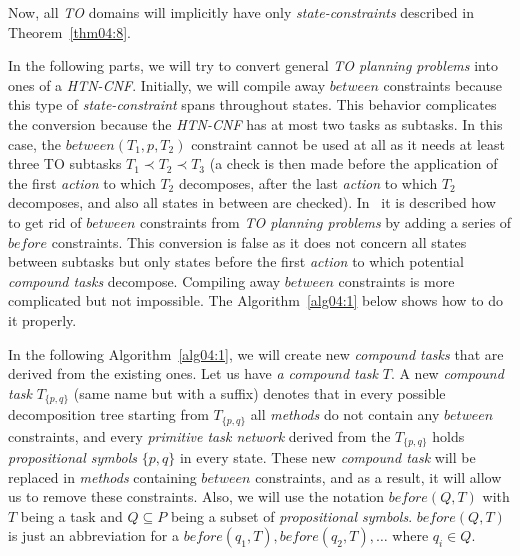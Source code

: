\medskip\noindent
Now, all \emph{TO} domains will implicitly have only \emph{state-constraints} described in Theorem~\ref{thm04:8}.

\medskip\noindent
In the following parts, we will try to convert general \emph{TO planning problems} into ones of a \emph{HTN-CNF}. Initially, we will compile away $between$ constraints because this type of \emph{state-constraint} spans throughout states. This behavior complicates the conversion because the \emph{HTN-CNF} has at most two tasks as subtasks. In this case, the $between(T_1, p, T_2)$ constraint cannot be used at all as it needs at least three TO subtasks $T_1 \prec T_2 \prec T_3$ (a check is then made before the application of the first \emph{action} to which $T_2$ decomposes, after the last \emph{action} to which $T_2$ decomposes, and also all states in between are checked). In~\cite{ondrckova2024empty} it is described how to get rid of $between$ constraints from \emph{TO planning problems} by adding a series of $before$ constraints. This conversion is false as it does not concern all states between subtasks but only states before the first \emph{action} to which potential \emph{compound tasks} decompose. Compiling away $between$ constraints is more complicated but not impossible. The Algorithm~\ref{alg04:1} below shows how to do it properly.

\medskip\noindent
In the following Algorithm~\ref{alg04:1}, we will create new \emph{compound tasks} that are derived from the existing ones. Let us have \emph{a compound task} $T$. A new \emph{compound task} $T_{\{p, q\}}$ (same name but with a suffix) denotes that in every possible decomposition tree starting from $T_{\{p, q\}}$ all \emph{methods} do not contain any $between$ constraints, and every \emph{primitive task network} derived from the $T_{\{p, q\}}$ holds \emph{propositional symbols} $\{p, q\}$ in every state. These new \emph{compound task} will be replaced in \emph{methods} containing $between$ constraints, and as a result, it will allow us to remove these constraints. Also, we will use the notation $before(Q, T)$ with $T$ being a task and $Q \subseteq P$ being a subset of \emph{propositional symbols}. $before(Q, T)$ is just an abbreviation for a $before(q_1, T), before(q_2, T), \dots$ where $q_i \in Q$.

